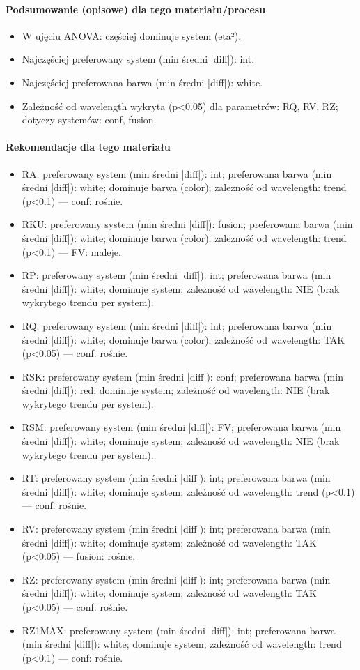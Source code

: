 \documentclass[
  10pt,
]{article}
\begin{document}
\paragraph{Podsumowanie (opisowe) dla tego materiału/procesu}
\begin{itemize}
\item W ujęciu ANOVA: częściej dominuje system (eta²).
\item Najczęściej preferowany system (min średni |diff|): int.
\item Najczęściej preferowana barwa (min średni |diff|): white.
\item Zależność od wavelength wykryta (p<0.05) dla parametrów: RQ, RV, RZ; dotyczy systemów: conf, fusion.
\end{itemize}
\paragraph{Rekomendacje dla tego materiału}
\begin{itemize}
\item RA: preferowany system (min średni |diff|): int; preferowana barwa (min średni |diff|): white; dominuje barwa (color); zależność od wavelength: trend (p<0.1) — conf: rośnie.
\item RKU: preferowany system (min średni |diff|): fusion; preferowana barwa (min średni |diff|): white; dominuje barwa (color); zależność od wavelength: trend (p<0.1) — FV: maleje.
\item RP: preferowany system (min średni |diff|): int; preferowana barwa (min średni |diff|): white; dominuje system; zależność od wavelength: NIE (brak wykrytego trendu per system).
\item RQ: preferowany system (min średni |diff|): int; preferowana barwa (min średni |diff|): white; dominuje barwa (color); zależność od wavelength: TAK (p<0.05) — conf: rośnie.
\item RSK: preferowany system (min średni |diff|): conf; preferowana barwa (min średni |diff|): red; dominuje system; zależność od wavelength: NIE (brak wykrytego trendu per system).
\item RSM: preferowany system (min średni |diff|): FV; preferowana barwa (min średni |diff|): white; dominuje system; zależność od wavelength: NIE (brak wykrytego trendu per system).
\item RT: preferowany system (min średni |diff|): int; preferowana barwa (min średni |diff|): white; dominuje system; zależność od wavelength: trend (p<0.1) — conf: rośnie.
\item RV: preferowany system (min średni |diff|): int; preferowana barwa (min średni |diff|): white; dominuje system; zależność od wavelength: TAK (p<0.05) — fusion: rośnie.
\item RZ: preferowany system (min średni |diff|): int; preferowana barwa (min średni |diff|): white; dominuje system; zależność od wavelength: TAK (p<0.05) — conf: rośnie.
\item RZ1MAX: preferowany system (min średni |diff|): int; preferowana barwa (min średni |diff|): white; dominuje system; zależność od wavelength: trend (p<0.1) — conf: rośnie.
\end{itemize}
\end{document}
